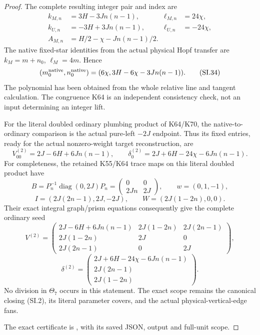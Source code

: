 \begin{proof}
The complete resulting integer pair and index are
\[
 \begin{aligned}
 k_{M,n}&=3H-3J n(n-1),&\ell_{M,n}&=24\chi,\\
 k_{U,n}&=-3H+3J n(n-1),&\ell_{U,n}&=-24\chi,\\
 A_{M,n}&=H/2-\chi-Jn(n-1)/2.
 \end{aligned}                                      \tag{SI.33}
\]
The native fixed-star identities from the actual physical
Hopf transfer are \(k_M=m+n_0\), \(\ell_M=4m\). Hence
\[
 (m_0^{\rm native},n_0^{\rm native})
       =(6\chi,3H-6\chi-3Jn(n-1)).                   \tag{SI.34}
\]
The polynomial has been obtained from the whole relative line
and tangent calculation. The congruence K64 is an independent
consistency check, not an input determining an integer lift.

For the literal doubled ordinary plumbing product of K64/K70,
the native-to-ordinary comparison is the actual pure-left
\(-2J\) endpoint. Thus its fixed entries, ready for the actual
nonzero-weight target reconstruction, are
\[
 V_{00}^{(2)}=2J-6H+6Jn(n-1),\qquad
 \delta_0^{(2)}=2J+6H-24\chi-6Jn(n-1).
                                                        \tag{SI.35}
\]
For completeness, the retained K55/K64 trace maps on this literal
doubled product have
\[
 B=P_n^{-1}\operatorname{diag}(0,2J)P_n
       =\begin{pmatrix}0&0\\2Jn&2J\end{pmatrix},\qquad
 w=(0,1,-1),
\]
\[
 I=(2J(2n-1),2J,-2J),\qquad
 W=(2J(1-2n),0,0).
\]
Their exact integral graph/prism equations consequently give the
complete ordinary seed
\[
 V^{(2)}=
 \begin{pmatrix}
 2J-6H+6Jn(n-1)&2J(1-2n)&2J(2n-1)\\
 2J(1-2n)&2J&0\\
 2J(2n-1)&0&2J
 \end{pmatrix},
\]
\[
 \delta^{(2)}=
 \begin{pmatrix}
 2J+6H-24\chi-6Jn(n-1)\\2J(2n-1)\\2J(1-2n)
 \end{pmatrix}.                                      \tag{SI.36}
\]
No division in \(\Theta_7\) occurs in this statement. The exact
scope remains the canonical closing (SI.2), its literal parameter
covers, and the actual physical-vertical-edge fans.

\par\medskip The exact certificate is , with its saved JSON, output and full-unit scope.
\end{proof}
